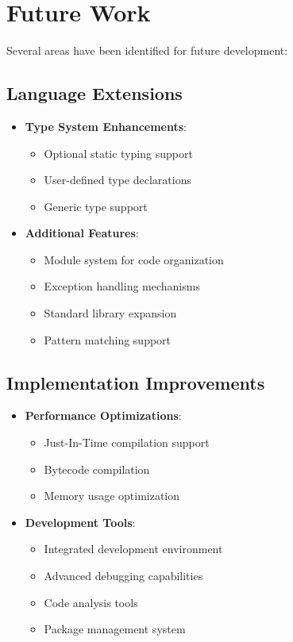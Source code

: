 \documentclass[conference]{IEEEtran}
\begin{document}
\section{Future Work}

Several areas have been identified for future development:

\subsection{Language Extensions}
\begin{itemize}
    \item \textbf{Type System Enhancements}:
    \begin{itemize}
        \item Optional static typing support
        \item User-defined type declarations
        \item Generic type support
    \end{itemize}
    
    \item \textbf{Additional Features}:
    \begin{itemize}
        \item Module system for code organization
        \item Exception handling mechanisms
        \item Standard library expansion
        \item Pattern matching support
    \end{itemize}
\end{itemize}

\subsection{Implementation Improvements}
\begin{itemize}
    \item \textbf{Performance Optimizations}:
    \begin{itemize}
        \item Just-In-Time compilation support
        \item Bytecode compilation
        \item Memory usage optimization
    \end{itemize}
    
    \item \textbf{Development Tools}:
    \begin{itemize}
        \item Integrated development environment
        \item Advanced debugging capabilities
        \item Code analysis tools
        \item Package management system
    \end{itemize}
\end{itemize}
\end{document}
